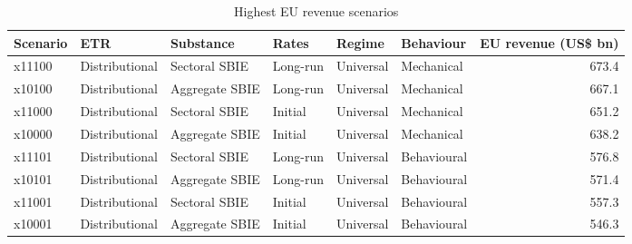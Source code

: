 \begin{table}[H]
\centering
\footnotesize
\setlength{\tabcolsep}{3pt}
\caption{Highest EU revenue scenarios}
\label{tab:app_stage46_top_scenarios}
\begin{tabular}{@{}llllllr@{}}
\toprule
Scenario & ETR & Substance & Rates & Regime & Behaviour & EU revenue (US\$ bn) \\
\midrule
x11100 & Distributional & Sectoral SBIE & Long-run & Universal & Mechanical & 673.4 \\
x10100 & Distributional & Aggregate SBIE & Long-run & Universal & Mechanical & 667.1 \\
x11000 & Distributional & Sectoral SBIE & Initial & Universal & Mechanical & 651.2 \\
x10000 & Distributional & Aggregate SBIE & Initial & Universal & Mechanical & 638.2 \\
x11101 & Distributional & Sectoral SBIE & Long-run & Universal & Behavioural & 576.8 \\
x10101 & Distributional & Aggregate SBIE & Long-run & Universal & Behavioural & 571.4 \\
x11001 & Distributional & Sectoral SBIE & Initial & Universal & Behavioural & 557.3 \\
x10001 & Distributional & Aggregate SBIE & Initial & Universal & Behavioural & 546.3 \\
\bottomrule
\end{tabular}
\end{table}
